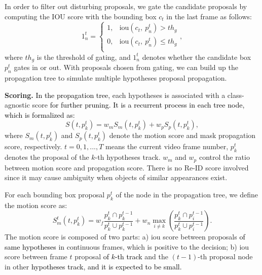 \documentclass[10pt,twocolumn,letterpaper]{article}
\newcommand{\ldz}[1]{\textcolor{black}{#1}}
\begin{document}
In order to filter out disturbing proposals, we gate the candidate proposals by computing the IOU score with the bounding box $c_t$ in the last frame as follows:
\begin{equation}
1_n^{t} = 
\left\{  
             \begin{array}{lr}
             1,  & \text{iou}(c_t,\ p_n^{t}) > th_{g}   \\  
             0,  & \text{iou}(c_t,\ p_n^{t}) \leq th_{g} \\  
             \end{array}
\right.,
\end{equation}
where $th_{g}$ is the threshold of gating, and $1_n^{t}$ denotes whether the candidate box $p_n^{t}$ gates in or out. With proposals chosen from gating, we can build up the propagation tree to simulate multiple hypotheses proposal propagation.


\textbf{Scoring.} 
\ldz{In the propagation tree}, each hypotheses is associated with a class-agnostic score \ldz{for further pruning. It is a recurrent process in each tree node, which is formalized as:}
\begin{equation}
S\left( {t,p_k^{{t}}} \right) = {w_m}{S_m}\left( {t,p_k^{{t}}} \right) + {w_p}{S_p}\left( {t,p_k^{{t}}} \right),
\end{equation}
where ${S_m}\left( {t,p_k^{{t}}} \right)$ and ${S_p}\left( {t,p_k^{{t}}} \right)$ denote the motion score and mask propagation score, respectively. $t=0,1,...,T$ means the current video frame number, $p_k^{{t}}$ denotes the proposal of the $k$-th hypotheses track. $w_m$ and $w_p$ control the ratio between motion score and propagation score. There is no Re-ID score involved since it may cause ambiguity when objects of similar appearances exist.

For each bounding box proposal $p_k^{{t}}$ of the node in the propagation tree, we define the motion score as:
\begin{equation}
S_m^t\left( {t,p_k^{{t}}} \right) = {w_{f}}\frac{{p_k^{{t}} \cap p_k^{{t - 1}}}}{{p_k^{{t}} \cup p_k^{{t - 1}}}} + {w_{n}}\mathop {\max }\limits_{i \ne k} \left( {\frac{{p_k^{{t}} \cap p_i^{{t - 1}}}}{{p_k^{{t}} \cup p_i^{{t - 1}}}}} \right).
\end{equation}
The motion score is composed of two parts: a) iou score between proposals \ldz{of same hypotheses} in continuous frames, which is positive to the decision; b) iou score between frame $t$ proposal \ldz{ of $k$-th track} and the $(t-1)$-th proposal node in other \ldz{hypotheses track}, \ldz{and it is expected to be small. }
\end{document}
